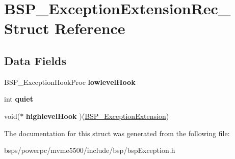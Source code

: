 \hypertarget{structBSP__ExceptionExtensionRec__}{}\section{B\+S\+P\+\_\+\+Exception\+Extension\+Rec\+\_\+ Struct Reference}
\label{structBSP__ExceptionExtensionRec__}
\subsection*{Data Fields}
\begin{DoxyCompactItemize}
\item 
\mbox{\label{structBSP__ExceptionExtensionRec___a2e79e53b5a6d1fe40534564ad89e926a}} 
B\+S\+P\+\_\+\+Exception\+Hook\+Proc {\bfseries lowlevel\+Hook}
\item 
\mbox{\label{structBSP__ExceptionExtensionRec___ad19fe5283eb1eaf7946b37953a48a840}} 
int {\bfseries quiet}
\item 
\mbox{\label{structBSP__ExceptionExtensionRec___aeacb9b9b43d9ea0bf0870c86e823eed5}} 
void($\ast$ {\bfseries highlevel\+Hook} )(\mbox{\hyperlink{structBSP__ExceptionExtensionRec__}{B\+S\+P\+\_\+\+Exception\+Extension}})
\end{DoxyCompactItemize}


The documentation for this struct was generated from the following file\+:\begin{DoxyCompactItemize}
\item 
bsps/powerpc/mvme5500/include/bsp/bsp\+Exception.\+h\end{DoxyCompactItemize}
